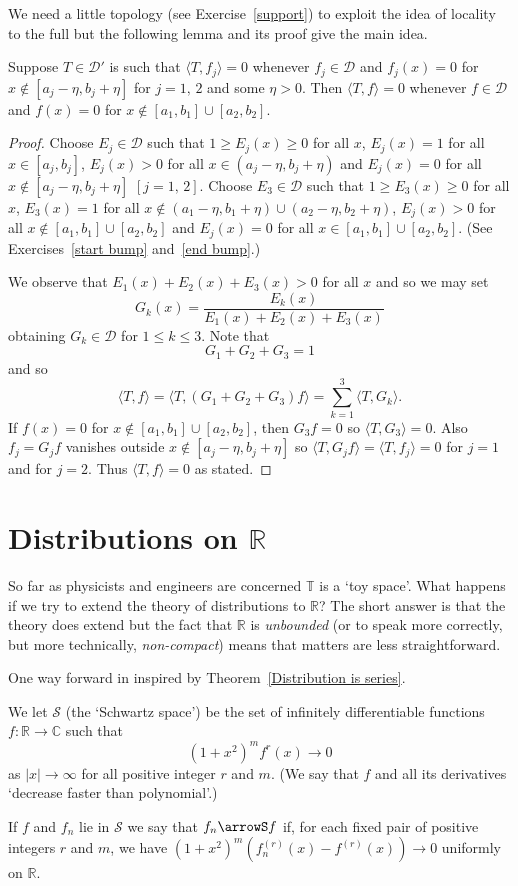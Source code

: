 We need a little topology (see Exercise~\ref{support}) to exploit the idea
of locality to the full but the following lemma and its proof
give the main idea.
\begin{lemma}\label{start support} Suppose $T\in{\mathcal D}'$
is such that $\langle T,f_{j}\rangle =0$ whenever $f_{j}\in\mathcal D$
and $f_{j}(x)=0$ for $x\notin[a_{j}-\eta,b_{j}+\eta]$
for $j=1,\,2$ and some $\eta>0$.
Then $\langle T,f\rangle =0$ whenever $f\in\mathcal D$
and $f(x)=0$ for $x\notin[a_{1},b_{1}]\cup[a_{2},b_{2}].$
\end{lemma}
\begin{proof} Choose $E_{j}\in{\mathcal D}$ such that
$1\geq E_{j}(x)\geq 0$ for all $x$,
$E_{j}(x)=1$ for all $x\in [a_{j},b_{j}]$,
$E_{j}(x)>0$ for all $x\in (a_{j}-\eta,b_{j}+\eta)$
and $E_{j}(x)=0$ for all $x\notin[a_{j}-\eta,b_{j}+\eta]$ $[j=1,\,2]$.
Choose $E_{3}\in{\mathcal D}$ such that
$1\geq E_{3}(x)\geq 0$ for all $x$,
$E_{3}(x)=1$ for all
$x\notin (a_{1}-\eta,b_{1}+\eta)\cup(a_{2}-\eta,b_{2}+\eta)$,
$E_{j}(x)>0$ for all $x\notin[a_{1},b_{1}]\cup[a_{2},b_{2}]$
and $E_{j}(x)=0$ for all $x\in[a_{1},b_{1}]\cup[a_{2},b_{2}]$.
(See  Exercises~\ref{start bump} and~\ref{end bump}.)

We observe that $E_{1}(x)+E_{2}(x)+E_{3}(x)>0$ for all $x$
and so we may set
\[G_{k}(x)=\frac{E_{k}(x)}{E_{1}(x)+E_{2}(x)+E_{3}(x)}\]
obtaining  $G_{k}\in{\mathcal D}$ for $1\leq k\leq 3$. Note
that
\[G_{1}+G_{2}+G_{3}=1\]
and so
\[\langle T,f\rangle= \langle T,(G_{1}+G_{2}+G_{3})f\rangle
=\sum_{k=1}^{3}\langle T,G_{k}\rangle.\]
If $f(x)=0$ for $x\notin[a_{1},b_{1}]\cup[a_{2},b_{2}]$,
then $G_{3}f=0$ so $\langle T,G_{3}\rangle=0$. Also
$f_{j}=G_{j}f$ vanishes outside $x\notin[a_{j}-\eta,b_{j}+\eta]$
so $\langle T,G_{j}f\rangle=\langle T,f_{j}\rangle=0$
for $j=1$ and for $j=2$. Thus $\langle T,f\rangle=0$
as stated.
\end{proof}
\section{Distributions on ${\mathbb R}$} So far as physicists
and engineers are concerned ${\mathbb T}$ is a `toy space'.
What happens if we try to extend the theory of distributions
to ${\mathbb R}$? The short answer is that the theory does extend
but the fact that ${\mathbb R}$
is \emph{unbounded} (or to speak more correctly,
but more technically, \emph{non-compact}) means that
matters are less straightforward.

One way forward in inspired by Theorem~\ref{Distribution is series}.
\begin{definition} We let ${\mathcal S}$
(the `Schwartz space') be the set of infinitely differentiable
functions $f:{\mathbb R}\rightarrow{\mathbb C}$
such that
\[(1+x^{2})^{m}f^{r}(x)\rightarrow 0\]
as $|x|\rightarrow \infty$ for all positive integer $r$ and $m$.
(We say that $f$ and all its derivatives `decrease
faster than polynomial'.)

If $f$ and $f_{n}$ lie in
${\mathcal S}$ we say that $f_{n}\arrowS f$
if, for each fixed pair of positive integers $r$ and $m$,
we have $(1+x^{2})^{m}(f_{n}^{(r)}(x)-f^{(r)}(x))\rightarrow 0$
uniformly on ${\mathbb R}$.
\end{definition}

